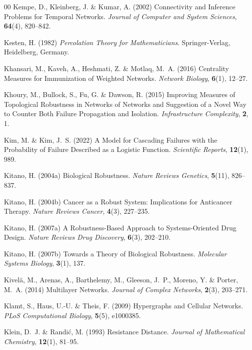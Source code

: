 \documentclass{comnet-mod}
\begin{document}
\begin{thebibliography}{00}
Kempe, D., Kleinberg, J. {\&} Kumar, A. (2002)  {Connectivity and Inference
  Problems for Temporal Networks}. {\em {Journal of Computer and System
  Sciences}}, \textbf{64}(4), 820--842.

Kesten, H. (1982) {\em {Percolation Theory for Mathematicians}}.
{Springer-Verlag}, {Heidelberg, Germany}.

Khansari, M., Kaveh, A., Heshmati, Z. {\&} Motlaq, M.~A. (2016)  {Centrality
  Measures for Immunization of Weighted Networks}. {\em {Network Biology}},
  \textbf{6}(1), 12--27.

Khoury, M., Bullock, S., Fu, G. {\&} Dawson, R. (2015)  {Improving Measures of
  Topological Robustness in Networks of Networks and Suggestion of a Novel Way
  to Counter Both Failure Propagation and Isolation}. {\em {Infrastructure
  Complexity}}, \textbf{2}, 1.

Kim, M. {\&} Kim, J.~S. (2022)  {A Model for Cascading Failures with the
  Probability of Failure Described as a Logistic Function}. {\em {Scientific
  Reports}}, \textbf{12}(1), 989.

Kitano, H. (2004a)  {Biological Robustness}. {\em {Nature Reviews Genetics}},
  \textbf{5}(11), 826--837.

Kitano, H. (2004b)  {Cancer as a Robust System: {{Implications}} for Anticancer
  Therapy}. {\em {Nature Reviews Cancer}}, \textbf{4}(3), 227--235.

Kitano, H. (2007a)  {A Robustness-Based Approach to Systems-Oriented Drug
  Design}. {\em {Nature Reviews Drug Discovery}}, \textbf{6}(3), 202--210.

Kitano, H. (2007b)  {Towards a Theory of Biological Robustness}. {\em
  {Molecular Systems Biology}}, \textbf{3}(1), 137.

Kivel{\"a}, M., Arenas, A., Barthelemy, M., Gleeson, J.~P., Moreno, Y. {\&}
  Porter, M.~A. (2014)  {Multilayer Networks}. {\em {Journal of Complex
  Networks}}, \textbf{2}(3), 203--271.

Klamt, S., Haus, U.-U. {\&} Theis, F. (2009)  {Hypergraphs and Cellular
  Networks}. {\em {PLoS Computational Biology}}, \textbf{5}(5), e1000385.

Klein, D.~J. {\&} Randi{\'c}, M. (1993)  {Resistance Distance}. {\em {Journal
  of Mathematical Chemistry}}, \textbf{12}(1), 81--95.


\end{thebibliography}
\end{document}
